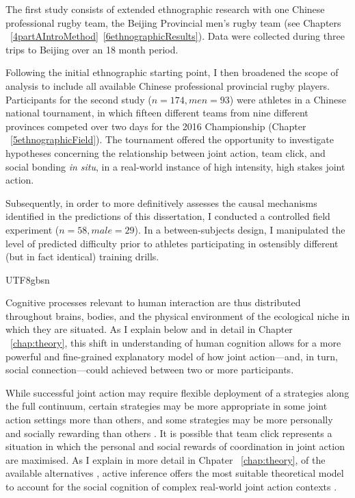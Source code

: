 \begin{CJK}{UTF8}{gbsn}
  The first study consists of extended ethnographic research with one Chinese professional rugby team, the Beijing Provincial men's rugby team (see Chapters ~\ref{4partAIntroMethod}\nobreakdash~\ref{6ethnographicResults}).  Data were collected during three trips to Beijing over an 18 month period.

  Following the initial ethnographic starting point, I then broadened the scope of analysis to include all available Chinese professional provincial rugby players. Participants for the second study ($n = 174, men = 93$) were athletes in a Chinese national tournament, in which fifteen different teams from nine different provinces competed over two days for the 2016 Championship (Chapter ~\ref{5ethnographicField}).  The tournament offered the opportunity to investigate hypotheses concerning the relationship between joint action, team click, and social bonding \textit{in situ}, in a real-world instance of high intensity, high stakes joint action.

  Subsequently, in order to more definitively assesses the causal mechanisms identified in the predictions of this dissertation, I conducted a controlled field experiment ($n = 58, male = 29$). In a between-subjects design, I manipulated the level of predicted difficulty prior to athletes participating in ostensibly different (but in fact identical) training drills.








\end{CJK}{UTF8}{gbsn}





Cognitive processes relevant to human interaction are thus distributed throughout brains, bodies, and the physical environment of the ecological niche in which they are situated.  As I explain below and in detail in Chapter ~\ref{chap:theory}, this shift in understanding of human cognition allows for a more powerful and fine-grained explanatory model of how joint action---and, in turn, social connection---could achieved between two or more participants.


While successful joint action may require flexible deployment of a strategies along the full continuum, certain strategies may be more appropriate in some joint action settings more than others, and some strategies may be more personally and socially rewarding than others \citep{Clark2015}.  It is possible that team click represents a situation in which the personal and social rewards of coordination in joint action are maximised. As I explain in more detail in Chpater ~\ref{chap:theory}, of the available alternatives \citep[see, for example,][]{Keller2016}, active inference offers the most suitable theoretical model to account for the social cognition of complex real-world joint action contexts \citep{Friston2015,Pesquita2017}.

